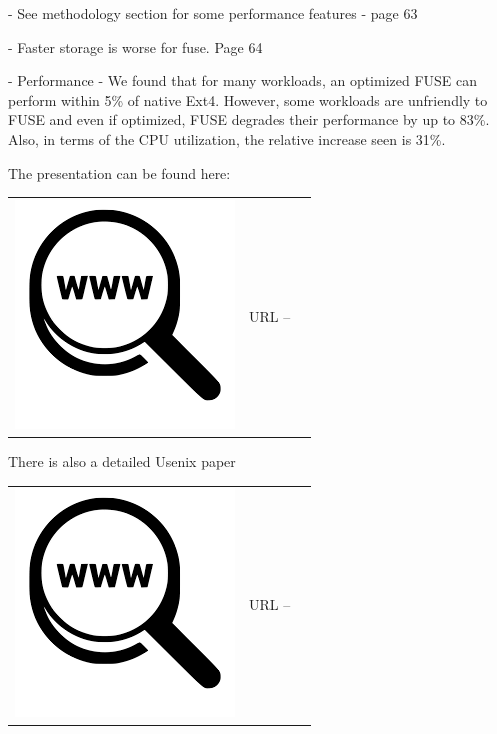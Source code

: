 - See methodology section for some performance features - page 63

- Faster storage is worse for fuse. Page 64

- Performance - We found that for many workloads, an optimized FUSE can perform within 5\% of native Ext4. However, some workloads are unfriendly to FUSE and even if optimized, FUSE degrades their performance by up to 83\%. Also, in terms of the CPU utilization, the relative increase seen is 31\%.



The presentation can be found here:

\begin{table}[h]
\begin{tabular}{lcl}
\parbox[r]{0.5in}{\includegraphics[scale=0.15]{figures/url.png}} & \parbox[l]{0.55in}{URL  -- } & \parbox[l]{3in}{}
\end{tabular}
\end{table}

\noindent
There is also a detailed Usenix paper 

\begin{table}[h]
\begin{tabular}{lcl}
\parbox[r]{0.5in}{\includegraphics[scale=0.15]{figures/url.png}} & \parbox[l]{0.55in}{URL  -- } & \parbox[l]{3in}{}
\end{tabular}
\end{table}

